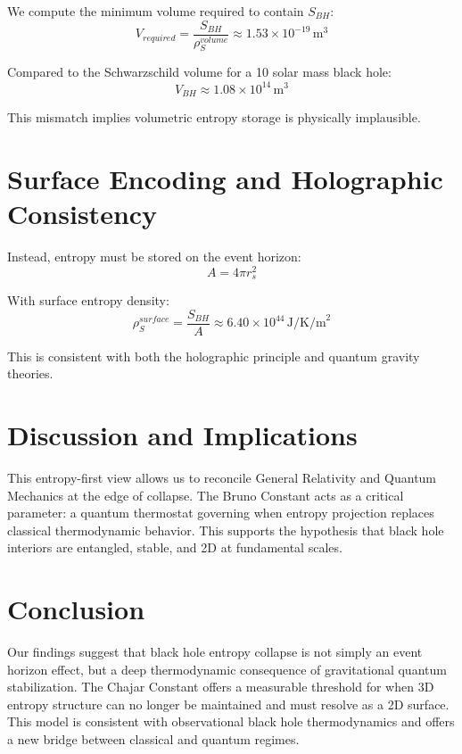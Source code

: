 \documentclass[12pt]{article}
\begin{document}
We compute the minimum volume required to contain $S_{BH}$:
\begin{equation}
V_{required} = \frac{S_{BH}}{\rho_S^{volume}} \approx 1.53 \times 10^{-19} \, \text{m}^3
\end{equation}

Compared to the Schwarzschild volume for a 10 solar mass black hole:
\begin{equation}
V_{BH} \approx 1.08 \times 10^{14} \, \text{m}^3
\end{equation}

This mismatch implies volumetric entropy storage is physically implausible.

\section{Surface Encoding and Holographic Consistency}

Instead, entropy must be stored on the event horizon:
\begin{equation}
A = 4\pi r_s^2
\end{equation}

With surface entropy density:
\begin{equation}
\rho_S^{surface} = \frac{S_{BH}}{A} \approx 6.40 \times 10^{44} \, \text{J/K/m}^2
\end{equation}

This is consistent with both the holographic principle and quantum gravity theories.

\section{Discussion and Implications}
This entropy-first view allows us to reconcile General Relativity and Quantum Mechanics at the edge of collapse. The Bruno Constant acts as a critical parameter: a quantum thermostat governing when entropy projection replaces classical thermodynamic behavior. This supports the hypothesis that black hole interiors are entangled, stable, and 2D at fundamental scales.

\section{Conclusion}

Our findings suggest that black hole entropy collapse is not simply an event horizon effect, but a deep thermodynamic consequence of gravitational quantum stabilization. The Chajar Constant offers a measurable threshold for when 3D entropy structure can no longer be maintained and must resolve as a 2D surface. This model is consistent with observational black hole thermodynamics and offers a new bridge between classical and quantum regimes.
\end{document}
